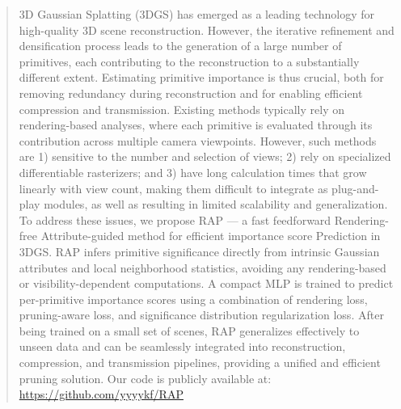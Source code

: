 \begin{abstract}
3D Gaussian Splatting (3DGS) has emerged as a leading technology for high-quality 3D scene reconstruction. However, the iterative refinement and densification process leads to the generation of a large number of primitives, each contributing to the reconstruction to a substantially different extent. Estimating primitive importance is thus crucial, both for removing redundancy during reconstruction and for enabling efficient compression and transmission.
Existing methods typically rely on rendering-based analyses, where each primitive is evaluated through its contribution across multiple camera viewpoints. However, such methods are 1) sensitive to the number and selection of views; 2) rely on specialized differentiable rasterizers; and 3) have long calculation times that grow linearly with view count, making them difficult to integrate as plug-and-play modules, as well as resulting in limited scalability and generalization.
To address these issues, we propose RAP — a fast feedforward Rendering-free Attribute-guided method for efficient importance score Prediction in 3DGS. RAP infers primitive significance directly from intrinsic Gaussian attributes and local neighborhood statistics, avoiding any rendering-based or visibility-dependent computations. A compact MLP is trained to predict per-primitive importance scores using a combination of rendering loss, pruning-aware loss, and significance distribution regularization loss. After being trained on a small set of scenes, RAP generalizes effectively to unseen data and can be seamlessly integrated into reconstruction, compression, and transmission pipelines, providing a unified and efficient pruning solution. Our code is publicly available at: \url{https://github.com/yyyykf/RAP}
\end{abstract}